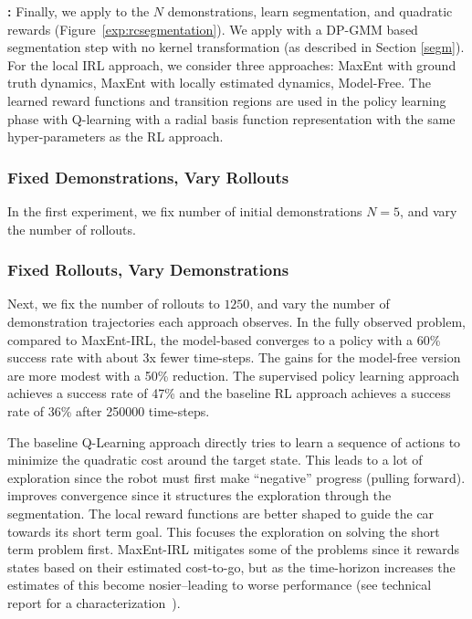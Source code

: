 \vspace{0.25em}\noindent \textbf{\hirl: } Finally, we apply \hirl to the $N$ demonstrations, learn segmentation, and quadratic rewards (Figure~\ref{exp:rcsegmentation}).
We apply \hirl with a DP-GMM based segmentation step with no kernel transformation (as described in Section \ref{segm}).
For the local IRL approach, we consider three approaches: MaxEnt with ground truth dynamics, MaxEnt with locally estimated dynamics, Model-Free. 
The learned reward functions and transition regions are used in the policy learning phase with Q-learning with a radial basis function representation with the same hyper-parameters as the RL approach.

\vspace{0.5em}

\subsubsection{Fixed Demonstrations, Vary Rollouts}
In the first experiment, we fix number of initial demonstrations $N=5$, and vary the number of rollouts.


\subsubsection{Fixed Rollouts, Vary Demonstrations}
Next, we fix the number of rollouts to $1250$, and vary the number of demonstration trajectories each approach observes.
In the fully observed problem, compared to MaxEnt-IRL, the model-based \hirl converges to a policy with a 60\% success rate with about 3x fewer time-steps.
The gains for the model-free version are more modest with a 50\% reduction.
The supervised policy learning approach achieves a success rate of 47\% and the baseline RL approach achieves a success rate of 36\% after 250000 time-steps.

The baseline Q-Learning approach directly tries to learn a sequence of actions to minimize the quadratic cost around the target state. 
This leads to a lot of exploration since the robot must first make ``negative'' progress (pulling forward). 
\hirl improves convergence since it structures the exploration through the segmentation.
The local reward functions are better shaped to guide the car towards its short term goal.
This focuses the exploration on solving the short term problem first.
MaxEnt-IRL mitigates some of the problems since it rewards states based on their estimated cost-to-go, but as the time-horizon increases the estimates of this become nosier--leading to worse performance (see technical report for a characterization~\cite{krishnan2016hirl}).


